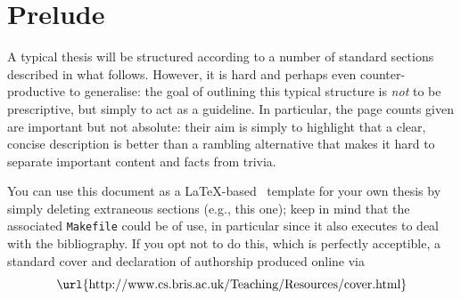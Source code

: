 \documentclass[ %
                    author={Sam Phippen},
                supervisor={Dr. Rafal Bogacz},
                     title={Real time voice activity detectors in noisy personal computing environments},
                  subtitle={},
                    degree={MEng},
                      year={2012} ]{thesis}
\begin{document}


\section*{Prelude}
\thispagestyle{empty}

A typical thesis will be structured according to a number of standard 
sections described in what follows.  However, it is hard and perhaps
even counter-productive to generalise: the goal of outlining this 
typical structure is {\em not} to be prescriptive, but simply to act 
as a guideline.  In particular, the page counts given are important 
but not absolute: their aim is simply to highlight that a clear, 
concise description is better than a rambling alternative that 
makes it hard to separate important content and facts from trivia.

You can use this document as a \LaTeX-based~\cite{latexbook1,latexbook2}
template for your own thesis by simply deleting extraneous sections (e.g., 
this one); keep in mind that the associated {\tt Makefile} could be of
use, in particular since it also executes \mbox{\BibTeX} to deal with the
bibliography.  If you opt not to do this, which is perfectly acceptible,
a standard cover and declaration of authorship produced online via
\[
\mbox{\url{http://www.cs.bris.ac.uk/Teaching/Resources/cover.html}}
\]



\maketitle


\frontmatter
\end{document}
